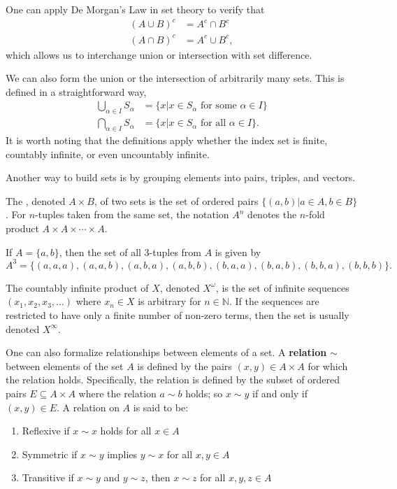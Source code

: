 One can apply De Morgan's Law in set theory to verify that
\begin{align*}
(A \cup B)^c & = A^c \cap B^c \\
(A \cap B)^c & = A^c \cup B^c,
\end{align*}
which allows us to interchange union or intersection with set difference.

We can also form the union or the intersection of arbitrarily many sets.
This is defined in a straightforward way,
\begin{align*}
\bigcup_{\alpha \in I} S_{\alpha}
&= \{ x | x \in S_{\alpha} \text{ for some } \alpha \in I \} \\
\bigcap_{\alpha \in I} S_{\alpha}
&= \{ x | x \in S_{\alpha} \text{ for all } \alpha \in I \} .
\end{align*}
It is worth noting that the definitions apply whether the index set is finite, countably infinite, or even uncountably infinite.

Another way to build sets is by grouping elements into pairs, triples, and vectors.
\begin{definition}
The , denoted $A\times B$, of two sets is the set of ordered pairs $\{(a,b) | a\in A, b\in B\}$.
For $n$-tuples taken from the same set, the notation $A^n$ denotes the $n$-fold product $A\times A \times \cdots \times A$.
\end{definition}
\begin{example}
If $A  = \{ a,b \}$, then the set of all 3-tuples from $A$ is given by 
\begin{equation*}
A^3 = \{ (a,a,a),(a,a,b),(a,b,a),(a,b,b),(b,a,a),(b,a,b),(b,b,a),(b,b,b) \}.
\end{equation*}
\end{example}
The countably infinite product of $X$, denoted $X^\omega$, is the set of infinite sequences $(x_1,x_2,x_3,\ldots)$ where $x_n \in X$ is arbitrary for $n\in \mathbb{N}$.
If the sequences are restricted to have only a finite number of non-zero terms, then the set is usually denoted $X^\infty$.

One can also formalize relationships between elements of a set.
A \textbf{relation} $\sim$ between elements of the set $A$ is defined by the pairs $(x,y)\in A\times A$ for which the relation holds.
Specifically, the relation is defined by the subset of ordered pairs $E\subseteq A\times A$ where the relation $a\sim b$ holds; so $x\sim y$ if and only if $(x,y)\in E$.
A relation on $A$ is said to be:
\begin{enumerate}
\item Reflexive if $x\sim x$ holds for all $x\in A$
\item Symmetric if $x\sim y$ implies $y\sim x$ for all $x,y\in A$
\item Transitive if $x\sim y$ and $y\sim z$, then $x\sim z$ for all $x,y,z\in A$
\end{enumerate}

